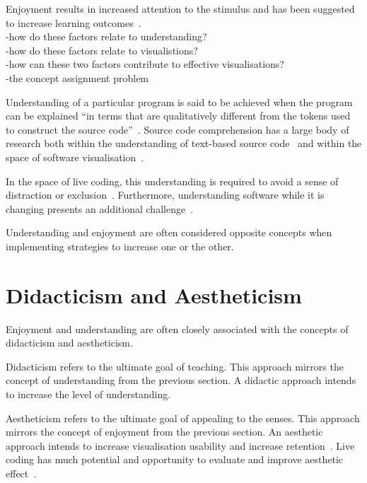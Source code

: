 Enjoyment results in increased attention to the stimulus and has been suggested to increase learning outcomes~.\\
-how do these factors relate to understanding?\\
-how do these factors relate to visualistions?\\
-how can these two factors contribute to effective visualisations?\\
-the concept assignment problem~\cite{Biggerstaff1994}

Understanding of a particular program is said to be achieved when the program can be explained ``in terms that are qualitatively different from the tokens used to construct the source code''~\cite{Biggerstaff1994}. Source code comprehension has a large body of research both within the understanding of text-based source code~ and within the space of software visualisation~\cite{Hosking2005}.

In the space of live coding, this understanding is required to avoid a sense of distraction or exclusion~\cite{McLean2010a}. Furthermore, understanding software while it is changing presents an additional challenge~\cite{Eisenbarth2003}.

Understanding and enjoyment are often considered opposite concepts when implementing strategies to increase one or the other. 

\section{Didacticism and Aestheticism}

Enjoyment and understanding are often closely associated with the concepts of didacticism and aestheticism.

Didacticism refers to the ultimate goal of teaching. This approach mirrors the concept of understanding from the previous section. A didactic approach intends to increase the level of understanding.

Aestheticism refers to the ultimate goal of appealing to the senses. This approach mirrors the concept of enjoyment from the previous section. An aesthetic approach intends to increase visualisation usability and increase retention~\cite{Cawthon2007}. Live coding has much potential and opportunity to evaluate and improve aesthetic effect~\cite{Bell}.

